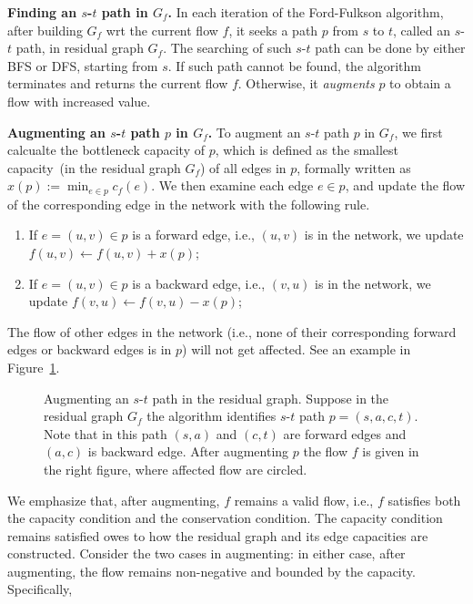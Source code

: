 {\bf Finding an $s$-$t$ path in $G_f$.}
In each iteration of the Ford-Fulkson algorithm, after building $G_f$ wrt the current flow $f$,
it seeks a path $p$ from $s$ to $t$, called an $s$-$t$ path, in residual graph $G_f$.
The searching of such $s$-$t$ path can be done by either BFS or DFS, starting from $s$.
If such path cannot be found, the algorithm terminates and returns the current flow $f$.
Otherwise, it \emph{augments} $p$ to obtain a flow with increased value. 

{\bf Augmenting an $s$-$t$ path $p$ in $G_f$.}
To augment an $s$-$t$ path $p$ in $G_f$, we first calcualte the bottleneck capacity of
$p$, which is defined as the smallest capacity~(in the residual graph $G_f$) of all edges in $p$, formally
written as $x(p) := \min_{e\in p} c_f(e)$. We then examine each edge $e \in p$, and
update the flow of the corresponding edge in the network with the following rule.

\begin{enumerate}
\item If $e = (u,v) \in p$ is a forward edge, i.e., $(u,v)$ is in the network, we update $f(u,v) \leftarrow f(u,v)+x(p)$;
\item If $e = (u,v) \in p$ is a backward edge, i.e., $(v,u)$ is in the network, we update $f(v,u) \leftarrow f(v,u)-x(p)$;
\end{enumerate}

The flow of other edges in the network (i.e., none of their corresponding
forward edges or backward edges is in $p$) will not get affected. See an
example in Figure~\ref{fig:augment}.

\begin{figure}[h]
\centering{}
\centering{}
\caption{Augmenting an $s$-$t$ path in the residual graph. 
Suppose in the residual graph $G_f$ the algorithm identifies $s$-$t$
path $p = (s,a,c,t)$. Note that in this path $(s,a)$ and $(c,t)$ are forward
edges and $(a, c)$ is backward edge. After augmenting $p$ the flow $f$ is given in the right figure,
where affected flow are circled.}
\label{fig:augment}
\end{figure}

We emphasize that, after augmenting, $f$ remains a valid flow, i.e., $f$ satisfies
both the capacity condition and the conservation condition. The capacity
condition remains satisfied owes to how the residual graph and its edge capacities are constructed.
Consider the two cases in augmenting: in either case, after augmenting, the
flow remains non-negative and bounded by the capacity. Specifically,


